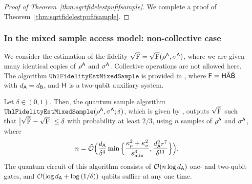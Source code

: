 \begin{proof}[Proof of Theorem~\ref{thm:sqrtfidelestpufifsample}]
We complete a proof of Theorem~\ref{thm:sqrtfidelestpufifsample}.


    
\end{proof}














\subsubsection{In the mixed sample access model: non-collective case}
\label{sec:fidelity estimation SS}


We consider the estimation of the fidelity $\sqrt{{\mathrm{F}}} = \sqrt{{\mathrm{F}}}(\rho^{\mathsf{A}}, \sigma^{\mathsf{A}})$, where we are given many identical copies of $\rho^{\mathsf{A}}$ and $\sigma^{\mathsf{A}}$. Collective operations are not allowed here.
The algorithm $\mathtt{UhlFidelityEstMixedSample}$ is provided in , where ${\mathsf{F}} = {\mathsf{H}}\hat{{\mathsf{A}}}\hat{{\mathsf{B}}}$ with $d_{\mathsf{A}} = d_{\mathsf{B}}$, and ${\mathsf{H}}$ is a two-qubit auxiliary system.



\begin{theorem}
\label{thm:fidelity est local sample}
Let $\delta \in (0, 1)$. Then, the quantum sample algorithm $\mathtt{UhlFidelityEstMixedSample}(\rho^{\mathsf{A}}, \sigma^{\mathsf{A}}; \delta)$,
which is given by , outputs $\sqrt{\tilde{{\mathrm{F}}}}$ such that $\big|\sqrt{\tilde{{\mathrm{F}}}} - \sqrt{{\mathrm{F}}}\big| \leq \delta$ with probability at least $2/3$, using $n$ samples of $\rho^{\mathsf{A}}$ and $\sigma^{\mathsf{A}}$, where
\begin{align}
    n = \tilde{{\mathcal{O}}}\Big(\frac{d_{\mathsf{A}}}{\delta^4}\min\Big\{\frac{\kappa_\rho^2 + \kappa_\sigma^2}{s_{\rm min}^3}, \frac{d_{\mathsf{A}}^2 r^7}{\delta^{11}}\Big\}\Big).
\end{align}
The quantum circuit of this algorithm consists of ${\mathcal{O}}(n\log{d_{\mathsf{A}}})$ one- and two-qubit gates, and ${\mathcal{O}}(\log{d_{\mathsf{A}}} + \log{(1/\delta)})$ qubits suffice at any one time.
\end{theorem}







